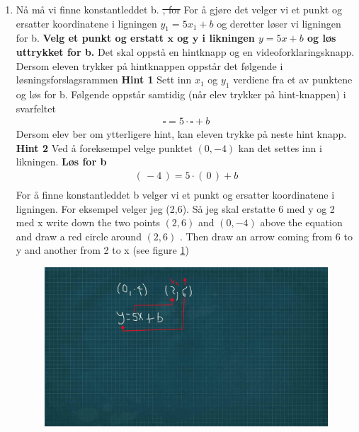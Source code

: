 \documentclass[12pt,twoside,onecolumn]{article}
\begin{document}
\begin{Exercise}
\begin{enumerate}
\item Nå må vi finne konstantleddet b. \st{, for} For å gjøre det velger vi et punkt og ersatter koordinatene i ligningen $y_1=5x_1+b$ og deretter løser vi ligningen for b. 
\newline
\textbf{Velg et punkt og erstatt $\mathbf{x}$ og $\mathbf{y}$ i likningen $y=5x+b$ og løs uttrykket for b.}
\newline
{\color{Maroon} Det skal oppstå en hintknapp og en videoforklaringsknapp. Dersom eleven trykker på hintknappen oppstår det følgende i løsningsforslagsrammen}
\newline
\newline
\textbf{Hint 1}
\newline
Sett inn $x_1$ og $y_1$ verdiene fra et av punktene og løs for b.
\newline
{\color{Maroon} Følgende oppstår samtidig (når elev trykker på hint-knappen) i svarfeltet}
\begin{align}
\square = 5\cdot\square + b
\end{align}
{\color{Maroon} Dersom elev ber om ytterligere hint, kan eleven trykke på neste hint knapp.}
\newline
\newline
\textbf{Hint 2}
\newline
Ved å foreksempel velge punktet $(0,-4)$ kan det settes inn i likningen.
\newline
\textbf{ Løs for b}
\begin{align}
(\, -4 \, ) = 5\cdot (\, 0 \, ) + b \\
\end{align}
{\color{gray}For å  finne konstantleddet b  velger vi et punkt og ersatter koordinatene i ligningen. For eksempel velger jeg (2,6). Så jeg skal erstatte 6 med y og 2 med x} \newline
{\color{PineGreen} write down the two points  $(2,6)$  and  $(0,-4 )$ above the equation and draw a red circle around $(2,6)$ . Then draw an arrow coming from 6 to y and another from 2 to x (see figure \ref{fig:Opp11S4})}
\begin{figure}[h!]
\label{fig:Opp11S4}
\centering
\includegraphics[scale = 1.3]{figures/Opp11S4.jpg}

\end{figure}
\end{enumerate}
\end{Exercise}
\end{document}
